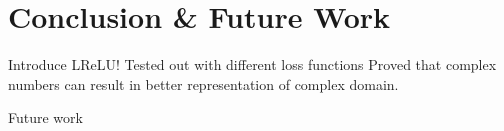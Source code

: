 \chapter{Conclusion \& Future Work} \label{chap:experiments}


Introduce LReLU! 
Tested out with different loss functions
Proved that complex numbers can result in better representation of complex domain. 

Future work